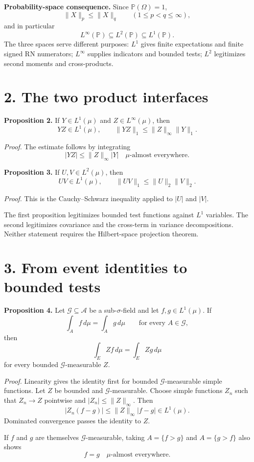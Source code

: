 \textbf{Probability-space consequence.}
Since $\mathbb P(\Omega)=1$,
\[
\|X\|_p\le\|X\|_q
\qquad(1\le p<q\le\infty),
\]
and in particular
\[
L^\infty(\mathbb P)
\subseteq
L^2(\mathbb P)
\subseteq
L^1(\mathbb P).
\]
The three spaces serve different purposes: $L^1$ gives finite expectations and finite signed RN numerators; $L^\infty$ supplies indicators and bounded tests; $L^2$ legitimizes second moments and cross-products.

\section*{2. The two product interfaces}

\textbf{Proposition 2.}
If $Y\in L^1(\mu)$ and $Z\in L^\infty(\mu)$, then
\[
YZ\in L^1(\mu),
\qquad
\|YZ\|_1
\le
\|Z\|_\infty\|Y\|_1.
\]

\textit{Proof.}
The estimate follows by integrating
\[
|YZ|
\le
\|Z\|_\infty |Y|
\quad\mu\text{-almost everywhere}.
\]

\textbf{Proposition 3.}
If $U,V\in L^2(\mu)$, then
\[
UV\in L^1(\mu),
\qquad
\|UV\|_1\le\|U\|_2\|V\|_2.
\]

\textit{Proof.}
This is the Cauchy--Schwarz inequality applied to $|U|$ and $|V|$.

The first proposition legitimizes bounded test functions against $L^1$ variables. The second legitimizes covariance and the cross-term in variance decompositions. Neither statement requires the Hilbert-space projection theorem.

\section*{3. From event identities to bounded tests}

\textbf{Proposition 4.}
Let $\mathcal G\subseteq\mathcal A$ be a sub-$\sigma$-field and let $f,g\in L^1(\mu)$. If
\[
\int_A f\,d\mu
=
\int_A g\,d\mu
\qquad\text{for every }A\in\mathcal G,
\]
then
\[
\int_E Zf\,d\mu
=
\int_E Zg\,d\mu
\]
for every bounded $\mathcal G$-measurable $Z$.

\textit{Proof.}
Linearity gives the identity first for bounded $\mathcal G$-measurable simple functions. Let $Z$ be bounded and $\mathcal G$-measurable. Choose simple functions $Z_n$ such that $Z_n\to Z$ pointwise and $|Z_n|\le\|Z\|_\infty$. Then
\[
|Z_n(f-g)|
\le
\|Z\|_\infty|f-g|\in L^1(\mu).
\]
Dominated convergence passes the identity to $Z$.

If $f$ and $g$ are themselves $\mathcal G$-measurable, taking $A=\{f>g\}$ and $A=\{g>f\}$ also shows
\[
f=g\quad\mu\text{-almost everywhere}.
\]

